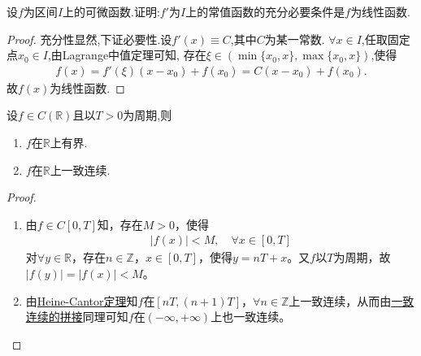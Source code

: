 \documentclass[../../main.tex]{subfiles}%
\begin{document}
\begin{proposition}\label{proposition:导数为常数的函数必是线性函数}
设\(f\)为区间\(I\)上的可微函数.证明:\(f'\)为\(I\)上的常值函数的充分必要条件是\(f\)为线性函数.
\end{proposition}
\begin{proof}

充分性显然,下证必要性.设$f'(x)\equiv C$,其中$C$为某一常数.
$\forall x\in I$,任取固定点$x_0\in I$,由Lagrange中值定理可知,
存在$\xi\in(\min\{x_0,x\},\max\{x_0,x\})$,使得
\begin{align*}
f(x)=f'(\xi)(x-x_0)+f(x_0)=C(x-x_0)+f(x_0).
\end{align*}
故$f(x)$为线性函数.

\end{proof}

\begin{proposition}[连续的周期函数的基本性质]\label{proposition:连续的周期函数的基本性质}
设$f\in C(\mathbb{R})$且以$T>0$为周期,则
\begin{enumerate}[(1)]
\item $f$在$\mathbb{R}$上有界.

\item $f$在$\mathbb{R}$上一致连续.
\end{enumerate}
\end{proposition}
\begin{proof}
\begin{enumerate}[(1)]
\item 由$f\in C\left[ 0,T \right]$知，存在$M>0$，使得
\begin{align*}
\left| f\left( x \right) \right|<M,\quad \forall x\in \left[ 0,T \right]
\end{align*}
对$\forall y\in \mathbb{R}$，存在$n\in \mathbb{Z}$，$x\in \left[ 0,T \right]$，使得$y=nT+x$。又$f$以$T$为周期，故$\left| f\left( y \right) \right|=\left| f\left( x \right) \right|<M$。

\item 由\hyperref[theroem:Heine-Cantor定理]{Heine-Cantor定理}知$f$在$\left[ nT,\left( n+1 \right) T \right]$，$\forall n\in \mathbb{Z}$上一致连续，从而由\hyperref[proposition:一致连续函数的拼接]{一致连续的拼接}同理可知$f$在$\left( -\infty ,+\infty \right)$上也一致连续。
\end{enumerate}

\end{proof}
\end{document}
